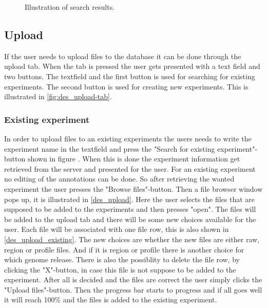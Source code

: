 \begin{figure}[htb]
	\caption{Illustration of search results.}
	\label{fig:des_search-results}
\end{figure}


\subsection{Upload}
If the user needs to upload files to the database it can be done through the upload tab. When the tab is pressed the user gets presented with a text field and two buttons. The textfield and the first button is used for searching for existing experiments. The second button is used for creating new experiments. This is illustrated in \ref{fig:des_upload-tab}.
\subsubsection{Existing experiment}
\label{sec:des_exists}
In order to upload files to an existing experiments the users needs to write the experiment name in the textfield and press the "Search for existing experiment"-button shown in figure . When this is done the experiment information get retrieved from the server and presented for the user. For an existing experiment no editing of the annotations can be done. So after retrieving the wanted experiment the user presses the "Browse files"-button. Then a file browser window pops up, it is illustrated in \ref{des_upload}. Here the user selects the files that are supposed to be added to the experiments and then presses "open". The files will be added to the upload tab and there will be some new choices available for the user. Each file  will be associated with one file row, this is also shown in \ref{des_upload_existing}. The new choices are whether the new files are either raw, region or profile files. And if it is region or profile there is another choice for which genome release. There is also the possiblity to delete the file row, by clicking the "X"-button, in case this file is not suppose to be added to the experiment. After all is decided and the files are correct the user simply clicks the "Upload files"-button. Then the progress bar starts to progress and if all goes well it will reach 100\% and the files is added to the existing experiment.
